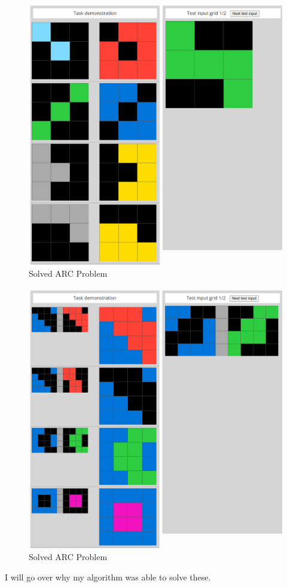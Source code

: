 \documentclass[letterpaper]{article} %
\begin{document}
\begin{figure}[htbp]
    \centering
    \includegraphics[width=0.8\hsize]{solved_3.png}
    \caption{Solved ARC Problem}
    \label{fig:solved_3}
\end{figure}
\begin{figure}[htbp]
    \centering
    \includegraphics[width=0.8\hsize]{solved_4.png}
    \caption{Solved ARC Problem}
    \label{fig:solved_4}
\end{figure}

\bigskip

I will go over why my algorithm was able to solve these.
\end{document}
